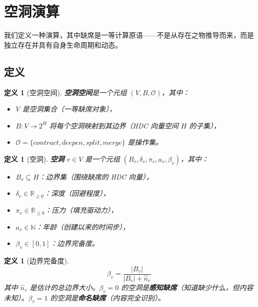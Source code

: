 \documentclass[11pt]{article}
\newtheorem{definition}[theorem]{定义}
\begin{document}
\section{空洞演算}
\label{sec:void}

我们定义一种演算，其中缺席是一等计算原语——不是从存在之物推导而来，而是独立存在并具有自身生命周期和动态。

\subsection{定义}

\begin{definition}[空洞空间]
\label{def:void-space}
\textbf{空洞空间}是一个元组 $(V, B, \mathcal{O})$，其中：
\begin{itemize}
\item $V$ 是空洞集合（一等缺席对象），
\item $B: V \to 2^H$ 将每个空洞映射到其边界（HDC 向量空间 $H$ 的子集），
\item $\mathcal{O} = \{contract, deepen, split, merge\}$ 是操作集。
\end{itemize}
\end{definition}

\begin{definition}[空洞]
\label{def:void}
\textbf{空洞} $v \in V$ 是一个元组 $(B_v, \delta_v, \pi_v, a_v, \beta_v)$，其中：
\begin{itemize}
\item $B_v \subseteq H$：边界集（围绕缺席的 HDC 向量），
\item $\delta_v \in \mathbb{R}_{\geq 0}$：深度（回避程度），
\item $\pi_v \in \mathbb{R}_{\geq 0}$：压力（填充驱动力），
\item $a_v \in \mathbb{N}$：年龄（创建以来的时间步），
\item $\beta_v \in [0,1]$：边界完备度。
\end{itemize}
\end{definition}

\begin{definition}[边界完备度]
\label{def:beta}
\begin{equation}
\beta_v = \frac{|B_v|}{|B_v| + \hat{n}_v}
\end{equation}
其中 $\hat{n}_v$ 是估计的总边界大小。$\beta_v = 0$ 的空洞是\textbf{感知缺席}（知道缺少什么，但内容未知）。$\beta_v = 1$ 的空洞是\textbf{命名缺席}（内容完全识别）。
\end{definition}
\end{document}
